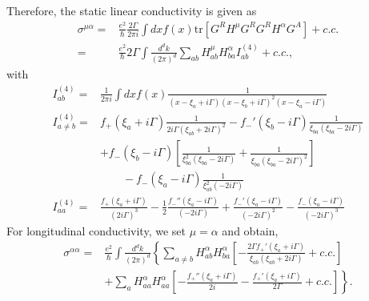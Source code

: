 \documentclass[twocolumn,superscriptaddress]{revtex4-1}
\begin{document}
Therefore, the static linear conductivity is given as
\begin{align}
  \sigma^{\mu\alpha}
  =& \frac{e^2}{\hbar}\frac{2\Gamma}{2\pi i}\int dx f(x)\mathrm{tr}[G^R H^\mu G^R G^R H^\alpha G^A]+c.c.\nonumber \\
  =& \frac{e^2}{\hbar} 2\Gamma \int \frac{d^d k}{(2\pi)^d} \sum_{ab} H_{ab}^\mu H_{ba}^\alpha I^{(4)}_{ab} +c.c., 
\end{align}
with
\begin{align}
  I^{(4)}_{ab}=&\frac{1}{2\pi i}\int dx f(x) \frac{1}{(x-\xi_a+i\Gamma)(x-\xi_b+i\Gamma)^2(x-\xi_a-i\Gamma)} \nonumber \\
  I^{(4)}_{a\neq b}=&f_+(\xi_a+i\Gamma)\frac{1}{2i\Gamma(\xi_{ab}+2i\Gamma)^2} - f_-'(\xi_b-i\Gamma)\frac{1}{\xi_{ba}(\xi_{ba}-2i\Gamma)} \nonumber \\
  &+f_-(\xi_b-i\Gamma)\left[
    \frac{1}{\xi_{ba}^2(\xi_{ba}-2i\Gamma)}+\frac{1}{\xi_{ba}(\xi_{ba}-2i\Gamma)^2}
  \right]\nonumber \\
  &\qquad -f_-(\xi_a-i\Gamma)\frac{1}{\xi_{ab}^2(-2i\Gamma)}\nonumber \\
  I^{(4)}_{aa}=&\frac{f_+(\xi_a+i\Gamma)}{(2i\Gamma)^3} -\frac{1}{2}\frac{f_-''(\xi_a-i\Gamma)}{(-2i\Gamma)}+\frac{f_-'(\xi_a-i\Gamma)}{(-2i\Gamma)^2}-\frac{f_-(\xi_a-i\Gamma)}{(-2i\Gamma)^3}
\end{align}
For longitudinal conductivity, we set $\mu=\alpha$ and obtain,
\begin{align}
  \sigma^{\alpha\alpha}
  =& \frac{e^2}{\hbar} \int \frac{d^d k}{(2\pi)^d} \left\{\sum_{a\neq b} H_{ab}^\alpha H_{ba}^\alpha \left[-\frac{2\Gamma f_+'(\xi_a+i\Gamma)}{\xi_{ab}(\xi_{ab}+2i\Gamma)}+c.c.\right]\right. \nonumber \\
  &\left. +\sum_a H_{aa}^\alpha H_{aa}^\alpha \left[-\frac{f_+''(\xi_a+i\Gamma)}{2i}-\frac{f_+'(\xi_a+i\Gamma)}{2\Gamma}+c.c.\right]\right\}.
\end{align}
\end{document}
